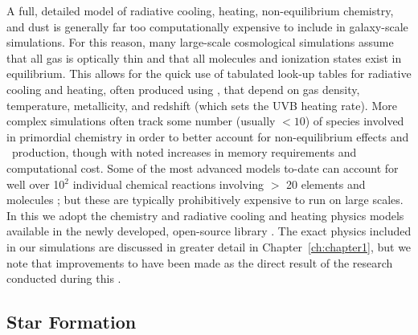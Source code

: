A full, detailed model of radiative cooling, heating, non-equilibrium chemistry, and dust is generally far too computationally expensive to include in galaxy-scale simulations. For this reason, many large-scale cosmological simulations assume that all gas is optically thin and that all molecules and ionization states exist in equilibrium. This allows for the quick use of tabulated look-up tables for radiative cooling and heating, often produced using  \citep{Cloudy2013}, that depend on gas density, temperature, metallicity, and redshift (which sets the UVB heating rate). More complex simulations often track some number (usually $< 10$) of species involved in primordial chemistry in order to better account for non-equilibrium effects and \Hmolecular~production, though with noted increases in memory requirements and computational cost. Some of the most advanced models to-date can account for well over 10$^2$ individual chemical reactions involving $>$ 20 elements and molecules \citep[e.g.][]{Richings2016,Richings2018}; but these are typically prohibitively expensive to run on large scales. In this \dissertation we adopt the chemistry and radiative cooling and heating physics models available in the newly developed, open-source library  \citep{GrackleMethod}. The exact physics included in our simulations are discussed in greater detail in Chapter~\ref{ch:chapter1}, but we note that improvements to  have been made as the direct result of the research conducted during this \Dissertation.

\subsection{Star Formation} \label{intro:sec:sf}


